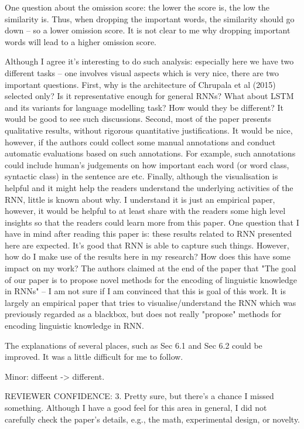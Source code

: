 \documentclass[10pt,a4paper]{letter}
\begin{document}
One question about the omission score: the lower the score is, the low the
similarity is. Thus, when dropping the important words, the similarity
should go down -- so a lower omission score. It is not clear to me why
dropping important words will lead to a higher omission score.

Although I agree it's interesting to do such analysis: especially here we
have two different tasks -- one involves visual aspects which is very nice,
there are two important questions. First, why is the architecture of
Chrupala et al (2015) selected only? Is it representative enough for general
RNNs? What about LSTM and its variants for language modelling task? How
would they be different? It would be good to see such discussions. Second,
most of the paper presents qualitative results, without rigorous
quantitative justifications. It would be nice, however, if the authors could
collect some manual annotations and conduct automatic evaluations based on
such annotations. For example, such annotations could include human's
judgements on how important each word (or word class, syntactic class) in
the sentence are etc. Finally, although the visualisation is helpful and it
might help the readers understand the underlying activities of the RNN,
little is known about why. I understand it is just an empirical paper,
however, it would be helpful to at least share with the readers some high
level insights so that the readers could learn more from this paper. One
question that I have in mind after reading this paper is: these results
related to RNN presented here are expected. It's good that RNN is able to
capture such things. However, how do I make use of the results here in my
research? How does this have some impact on my work? The authors claimed at
the end of the paper that "The goal of our paper is to propose novel methods
for the encoding of linguistic knowledge in RNNs" -- I am not sure if I am
convinced that this is goal of this work. It is largely an empirical paper
that tries to visualise/understand the RNN which was previously regarded as
a blackbox, but does not really "propose" methods for encoding linguistic
knowledge in RNN.

The explanations of several places, such as Sec 6.1 and Sec 6.2 could be
improved. It was a little difficult for me to follow.

Minor: diffeent -> different.

REVIEWER CONFIDENCE:
        3. Pretty sure, but there's a chance I missed something. Although I have a
good feel for this area in general, I did not carefully check the paper's
details, e.g., the math, experimental design, or novelty.
\end{document}
